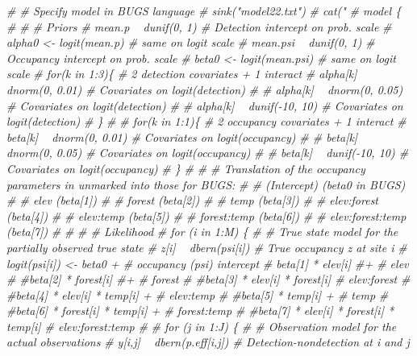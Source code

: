 \documentclass[
]{book}
\newenvironment{Shaded}{\begin{snugshade}}{\end{snugshade}}
\newcommand{\CommentTok}[1]{\textcolor[rgb]{0.56,0.35,0.01}{\textit{#1}}}
\begin{document}
\begin{Shaded}
\begin{Highlighting}[]
\CommentTok{# # Specify model in BUGS language}
\CommentTok{# sink("model22.txt")}
\CommentTok{# cat("}
\CommentTok{# model \{}
\CommentTok{# }
\CommentTok{# # Priors}
\CommentTok{# mean.p ~ dunif(0, 1)        # Detection intercept on prob. scale}
\CommentTok{# alpha0 <- logit(mean.p)     # same on logit scale}
\CommentTok{# mean.psi ~ dunif(0, 1)      # Occupancy intercept on prob. scale}
\CommentTok{# beta0 <- logit(mean.psi)    # same on logit scale}
\CommentTok{# for(k in 1:3)\{              # 2 detection covariates + 1 interact}
\CommentTok{#     alpha[k] ~ dnorm(0, 0.01) # Covariates on logit(detection)}
\CommentTok{# #   alpha[k] ~ dnorm(0, 0.05) # Covariates on logit(detection)}
\CommentTok{# #   alpha[k] ~ dunif(-10, 10) # Covariates on logit(detection)}
\CommentTok{# \}}
\CommentTok{# }
\CommentTok{# for(k in 1:1)\{                # 2 occupancy covariates + 1 interact}
\CommentTok{#     beta[k] ~ dnorm(0, 0.01)  # Covariates on logit(occupancy)}
\CommentTok{# #   beta[k] ~ dnorm(0, 0.05)  # Covariates on logit(occupancy)}
\CommentTok{# #   beta[k] ~ dunif(-10, 10)  # Covariates on logit(occupancy)}
\CommentTok{# \}}
\CommentTok{# }
\CommentTok{# # Translation of the occupancy parameters in unmarked into those for BUGS:}
\CommentTok{# # (Intercept)         (beta0 in BUGS)}
\CommentTok{# # elev                (beta[1])}
\CommentTok{# # forest              (beta[2])}
\CommentTok{# # temp                (beta[3])}
\CommentTok{# # elev:forest         (beta[4])}
\CommentTok{# # elev:temp           (beta[5])}
\CommentTok{# # forest:temp         (beta[6])}
\CommentTok{# # elev:forest:temp    (beta[7])}
\CommentTok{# }
\CommentTok{# }
\CommentTok{# # Likelihood}
\CommentTok{# for (i in 1:M) \{}
\CommentTok{#   # True state model for the partially observed true state}
\CommentTok{#   z[i] ~ dbern(psi[i])                      # True occupancy z at site i}
\CommentTok{#   logit(psi[i]) <- beta0 +                  # occupancy (psi) intercept}
\CommentTok{#     beta[1] * elev[i] #+                     # elev}
\CommentTok{#     #beta[2] * forest[i] #+                  # forest}
\CommentTok{#     #beta[3] * elev[i] * forest[i]          # elev:forest}
\CommentTok{#     #beta[4] * elev[i] * temp[i] +          # elev:temp}
\CommentTok{#     #beta[5] * temp[i] +                    # temp}
\CommentTok{#     #beta[6] * forest[i] * temp[i] +        # forest:temp}
\CommentTok{#     #beta[7] * elev[i] * forest[i] * temp[i]   # elev:forest:temp}
\CommentTok{# }
\CommentTok{#    for (j in 1:J) \{}
\CommentTok{#       # Observation model for the actual observations}
\CommentTok{#       y[i,j] ~ dbern(p.eff[i,j])      # Detection-nondetection at i and j}

\end{Highlighting}
\end{Shaded}
\end{document}
